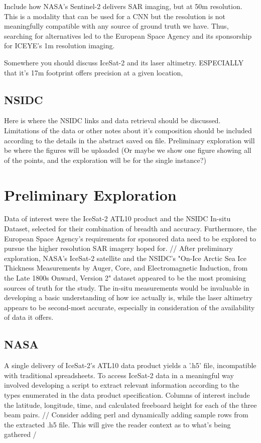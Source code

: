 Include how NASA's Sentinel-2 delivers SAR imaging, but at 50m resolution. This is a modality that can be used for a CNN but the resolution is not meaningfully compatible with any source of ground truth we have. Thus, searching for alternatives led to the European Space Agency and its sponsorship for ICEYE's 1m resolution imaging.

Somewhere you should discuss IceSat-2 and its laser altimetry. ESPECIALLY that it's 17m footprint offers precision at a given location, 
\subsection*{NSIDC}
Here is where the NSIDC links and data retrieval should be discussed. Limitations of the data or other notes about it's composition should be included according to the details in the abstract saved on file. Preliminary exploration will be where the figures will be uploaded (Or maybe we show one figure showing all of the points, and the exploration will be for the single instance?)

\section {Preliminary Exploration}
Data of interest were the IceSat-2 ATL10 product and the NSIDC In-situ Dataset, selected for their combination of breadth and accuracy. Furthermore, the European Space Agency's requirements for sponsored data need to be explored to pursue the higher resolution SAR imagery hoped for. //
After preliminary exploration, NASA's IceSat-2 satellite and the NSIDC's "On-Ice Arctic Sea Ice Thickness Measurements by Auger, Core, and Electromagnetic Induction, from the Late 1800s Onward, Version 2" dataset appeared to be the most promising sources of truth for the study. The in-situ measurements would be invaluable in developing a basic understanding of how ice actually is, while the laser altimetry appears to be second-most accurate, especially in consideration of the availability of data it offers.
\subsection*{NASA}
A single delivery of IceSat-2's ATL10 data product yields a '.h5' file, incompatible with traditional spreadsheets. To access IceSat-2 data in a meaningful way involved developing a script to extract relevant information according to the types enumerated in the data product specification. Columns of interest include the latitude, longitude, time, and calculated freeboard height for each of the three beam pairs.
// Consider adding perl and dynamically adding sample rows from the extracted .h5 file. This will give the reader context as to what's being gathered /
